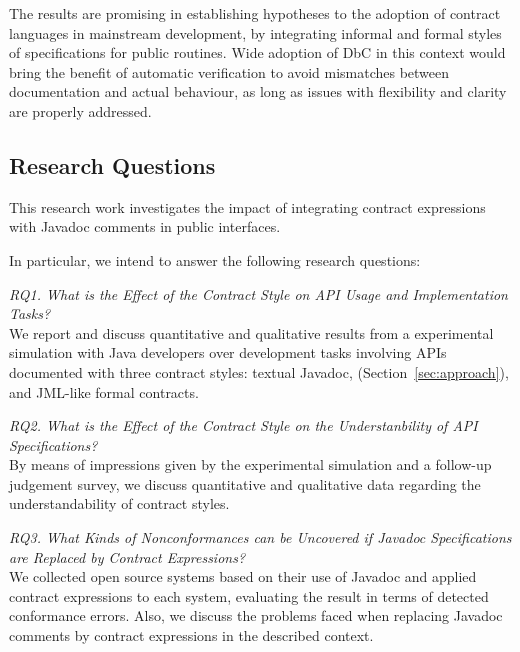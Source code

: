 The results are promising in establishing hypotheses to the adoption of contract languages in mainstream development, by integrating informal and formal styles of specifications for public routines.
Wide adoption of DbC in this context would bring the benefit of automatic verification to avoid mismatches between documentation and actual behaviour, as long as issues with flexibility and clarity are properly addressed. 


\subsection{Research Questions}
\label{sec:researchQuestions}

This research work investigates the impact of integrating contract expressions with Javadoc comments in public interfaces. 

In particular, we intend to answer the following research questions:  

\noindent\emph{RQ1. What is the Effect of the Contract Style on API Usage and Implementation Tasks?}\\
We report and discuss quantitative and qualitative results from a experimental simulation with Java developers over development tasks involving APIs documented with three contract styles: textual Javadoc, \contractjdoc{} (Section~\ref{sec:approach}), and JML-like formal contracts. 

\noindent\emph{RQ2. What is the Effect of the Contract Style on the Understanbility of API Specifications?}\\
By means of impressions given by the experimental simulation and a follow-up judgement survey, we discuss quantitative and qualitative data regarding the understandability of contract styles.

\noindent\emph{RQ3. What Kinds of Nonconformances can be Uncovered if Javadoc Specifications are Replaced by Contract Expressions?}\\
We collected open source systems based on their use of Javadoc and applied contract expressions
to each system, evaluating the result in terms of detected conformance errors. Also, we discuss the problems faced when replacing Javadoc comments by contract expressions in the described context.
